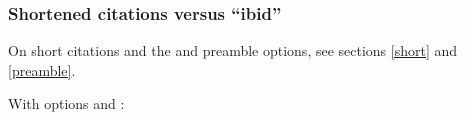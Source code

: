 \documentclass[11pt,letterpaper,oneside]{article}
\begin{document}
\setcounter{subsubsection}{33}
\subsubsection{Shortened citations versus ``ibid''}
\label{14.34}

On short citations and the  and  preamble
options, see sections \ref{short} and \ref{preamble}.

\begin{citeonly}
\item \cite[3]{morrison2004a}
\item \cite[18]{morrison2004a}
\item \cite[18]{morrison2004a}
\item \cite[24--26]{morrison2004a}
\item \cite[401-2]{morrison2004b}
\item \cite[433]{morrison2004b}
\item \cite[37--38]{diaz2008}
\item \cite[403]{morrison2004b}
\item \cite[152]{diaz2008}
\item \cite[201-2]{diaz2008}
\item \cites[240]{morrison2004b}[32]{morrison2004a}
 \item \cite[33]{morrison2004a}
\end{citeonly}

\noindent With options  and :
\end{document}
